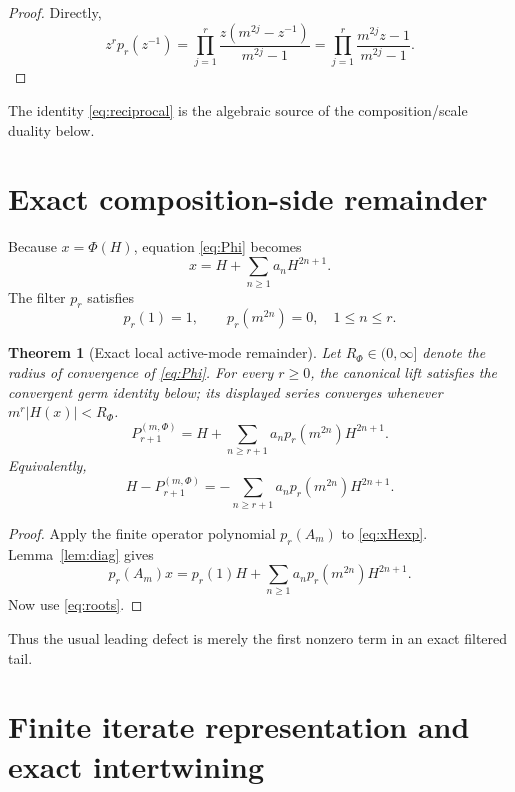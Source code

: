 \documentclass[11pt]{article}
\newtheorem{theorem}{Theorem}[section]
\theoremstyle{remark}
\begin{document}
\begin{proof}
Directly,
\[
z^r p_r(z^{-1})
=
\prod_{j=1}^r
\frac{z(m^{2j}-z^{-1})}{m^{2j}-1}
=
\prod_{j=1}^r
\frac{m^{2j}z-1}{m^{2j}-1}.
\]
\end{proof}

The identity \eqref{eq:reciprocal} is the algebraic source of the
composition/scale duality below.

\section{Exact composition-side remainder}

Because \(x=\Phi(H)\), equation \eqref{eq:Phi} becomes
\begin{equation}
x
=
H+\sum_{n\ge1}a_nH^{2n+1}.
\label{eq:xHexp}
\end{equation}
The filter \(p_r\) satisfies
\begin{equation}
p_r(1)=1,
\qquad
p_r(m^{2n})=0,
\quad 1\le n\le r.
\label{eq:roots}
\end{equation}

\begin{theorem}[Exact local active-mode remainder]
\label{thm:localExact}
Let \(R_\Phi\in(0,\infty]\) denote the radius of convergence of
\eqref{eq:Phi}.  For every \(r\ge0\), the canonical lift satisfies the
convergent germ identity below; its displayed series converges whenever
\(m^r|H(x)|<R_\Phi\).
\begin{equation}
\boxed{
P_{r+1}^{(m,\Phi)}
=
H+
\sum_{n\ge r+1}
a_n p_r(m^{2n})H^{2n+1}.
}
\label{eq:Pexact}
\end{equation}
Equivalently,
\begin{equation}
\boxed{
H-P_{r+1}^{(m,\Phi)}
=
-\sum_{n\ge r+1}
a_n p_r(m^{2n})H^{2n+1}.
}
\label{eq:localExact}
\end{equation}
\end{theorem}

\begin{proof}
Apply the finite operator polynomial \(p_r(A_m)\) to
\eqref{eq:xHexp}.  Lemma~\ref{lem:diag} gives
\[
p_r(A_m)x
=
p_r(1)H
+
\sum_{n\ge1}a_n p_r(m^{2n})H^{2n+1}.
\]
Now use \eqref{eq:roots}.
\end{proof}

Thus the usual leading defect is merely the first nonzero term in an
exact filtered tail.

\section{Finite iterate representation and exact intertwining}
\end{document}
